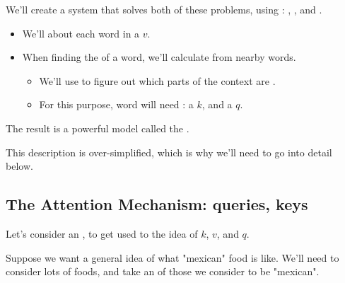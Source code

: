     \begin{concept}
        We'll create a system that solves both of these problems, using : , , and .

        \phantom{}

        \begin{itemize}
            \item We'll   about each word in a  $v$.
    
            \item When finding the  of a word, we'll calculate  from nearby words.
    
            \begin{itemize}
                \item We'll use  to figure out which parts of the context are .
                
                \item For this purpose, word will need : a  $k$, and a  $q$.
            \end{itemize}
        \end{itemize}

        \phantom{}

        The result is a powerful model called the .
    \end{concept}

    This description is over-simplified, which is why we'll need to go into detail below.

    

    




    \phantom{}

    \subsection{The Attention Mechanism: queries, keys}

        Let's consider an , to get used to the idea of $k$, $v$, and $q$.

        Suppose we want a general idea of what "mexican" food is like. We'll need to consider lots of foods, and take an  of those we consider to be "mexican".

